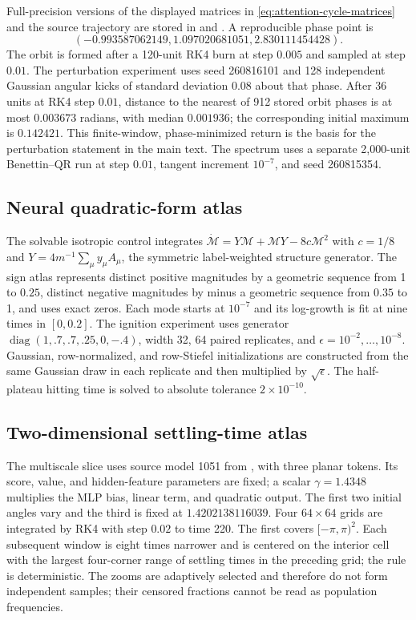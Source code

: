 \documentclass[11pt,a4paper]{article}
\theoremstyle{definition}
\begin{document}
Full-precision versions of the displayed matrices in
\eqref{eq:attention-cycle-matrices} and the source
trajectory are stored in
 and
.
A reproducible phase point is
\[
 (-0.993587062149, 1.097020681051, 2.830111454428).
\]
The orbit is formed after a 120-unit RK4 burn at step $0.005$ and sampled at step
$0.01$.  The perturbation experiment uses seed 260816101 and 128 independent Gaussian
angular kicks of standard deviation $0.08$ about that phase.  After 36 units at RK4
step $0.01$, distance to the nearest of 912 stored orbit phases is at most
$0.003673$ radians, with median $0.001936$; the corresponding initial maximum is
$0.142421$.  This finite-window, phase-minimized return is the basis for the
perturbation statement in the main text.  The spectrum uses a separate 2,000-unit
Benettin--QR run at step $0.01$, tangent increment $10^{-7}$, and seed 260815354.

\subsection{Neural quadratic-form atlas}

The solvable isotropic control integrates
$\dot{\mathcal M}=Y\mathcal M+\mathcal M Y-8c\mathcal M^2$ with $c=1/8$ and
$Y=4m^{-1}\sum_\mu y_\mu A_\mu$, the symmetric label-weighted structure generator.
The sign atlas represents distinct positive magnitudes by a geometric sequence from
1 to $0.25$, distinct negative magnitudes by minus a geometric sequence from $0.35$
to 1, and uses exact zeros.  Each mode starts at $10^{-7}$ and its log-growth is fit
at nine times in $[0,0.2]$.  The ignition experiment uses generator
$\operatorname{diag}(1,.7,.7,.25,0,-.4)$, width 32, 64 paired replicates, and
$\epsilon=10^{-2},\ldots,10^{-8}$.  Gaussian, row-normalized, and row-Stiefel
initializations are constructed from the same Gaussian draw in each replicate and
then multiplied by $\sqrt\epsilon$.  The half-plateau hitting time is solved to
absolute tolerance $2\times10^{-10}$.

\subsection{Two-dimensional settling-time atlas}

The multiscale slice uses source model 1051 from
,
with three planar tokens.  Its
score, value, and hidden-feature parameters are fixed; a scalar $\gamma=1.4348$
multiplies the MLP bias, linear term, and quadratic output.  The first two initial
angles vary and the third is fixed at $1.4202138116039$.  Four $64\times64$ grids are
integrated by RK4 with step $0.02$ to time 220.  The first covers
$[-\pi,\pi)^2$.  Each subsequent window is eight times narrower and is centered on
the interior cell with the largest four-corner range of settling times in the
preceding grid; the rule is deterministic.
The zooms are adaptively selected and therefore do not form independent samples;
their censored fractions cannot be read as population frequencies.
\end{document}
